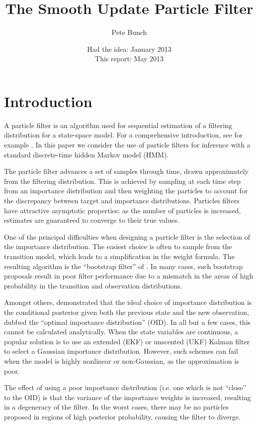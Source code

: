 \documentclass[a4paper,10pt]{article}
\title{The Smooth Update Particle Filter}
\author{Pete Bunch}
\date{Had the idea: January 2013 \\ This report: May 2013}
\begin{document}
\maketitle

\begin{abstract}
\end{abstract}

\section{Introduction}

A particle filter is an algorithm used for sequential estimation of a filtering distribution for a state-space model. For a comprehensive introduction, see for example \cite{Cappe2007,Doucet2009}. In this paper we consider the use of particle filters for inference with a standard discrete-time hidden Markov model (HMM).

The particle filter advances a set of samples through time, drawn approximately from the filtering distribution. This is achieved by sampling at each time step from an importance distribution and then weighting the particles to account for the discrepancy between target and importance distributions. Particles filters have attractive asymptotic properties: as the number of particles is increased, estimates are guaranteed to converge to their true values.

One of the principal difficulties when designing a particle filter is the selection of the importance distribution. The easiest choice is often to sample from the transition model, which leads to a simplification in the weight formula. The resulting algorithm is the ``bootstrap filter'' of \cite{Gordon1993}. In many cases, such bootstrap proposals result in poor filter performance due to a mismatch in the areas of high probability in the transition and observation distributions.

Amongst others, \cite{Doucet2000a} demonstrated that the ideal choice of importance distribution is the conditional posterior given both the previous state and the new observation, dubbed the ``optimal importance distribution'' (OID). In all but a few cases, this cannot be calculated analytically. When the state variables are continuous, a popular solution is to use an extended (EKF) or unscented (UKF) Kalman filter to select a Gaussian importance distribution. However, such schemes can fail when the model is highly nonlinear or non-Gaussian, as the approximation is poor.

The effect of using a poor importance distribution (i.e. one which is not ``close'' to the OID) is that the variance of the importance weights is increased, resulting in a degeneracy of the filter. In the worst cases, there may be no particles proposed in regions of high posterior probability, causing the filter to diverge.
\end{document}

